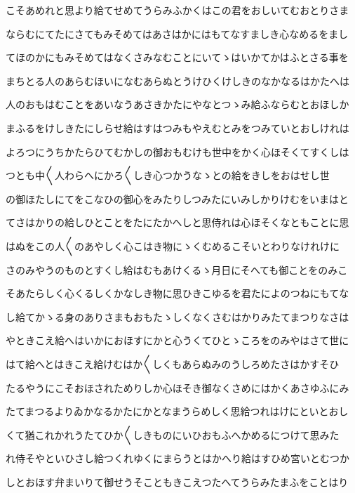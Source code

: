 \documentclass[a4paper,11pt,landscape]{ltjtarticle}
\begin{document}
\par\medskip
こそあめれと思より給てせめてうらみふかくはこの君をおしいてむおとりさま
\par\medskip
ならむにてたにさてもみそめてはあさはかにはもてなすましき心なめるをまし
\par\medskip
てほのかにもみそめてはなくさみなむことにいてゝはいかてかはふとさる事を
\par\medskip
まちとる人のあらむほいになむあらぬとうけひくけしきのなかなるはかたへは
\par\medskip
人のおもはむことをあいなうあさきかたにやなとつゝみ給ふならむとおほしか
\par\medskip
まふるをけしきたにしらせ給はすはつみもやえむとみをつみていとおしけれは
\par\medskip
よろつにうちかたらひてむかしの御おもむけも世中をかく心ほそくてすくしは
\par\medskip
つとも中〱人わらへにかろ〱しき心つかうなゝとの給をきしをおはせし世
\par\medskip
の御ほたしにてをこなひの御心をみたりしつみたにいみしかりけむをいまはと
\par\medskip
てさはかりの給しひとことをたにたかへしと思侍れは心ほそくなともことに思
\par\medskip
はぬをこの人〱のあやしく心こはき物にゝくむめるこそいとわりなけれけに
\par\medskip
さのみやうのものとすくし給はむもあけくるゝ月日にそへても御ことをのみこ
\par\medskip
そあたらしく心くるしくかなしき物に思ひきこゆるを君たによのつねにもてな
\par\medskip
し給てかゝる身のありさまもおもたゝしくなくさむはかりみたてまつりなさは
\par\medskip
やときこえ給へはいかにおほすにかと心うくてひとゝころをのみやはさて世に
\par\medskip
はて給へとはきこえ給けむはか〱しくもあらぬみのうしろめたさはかすそひ
\par\medskip
たるやうにこそおほされためりしか心ほそき御なくさめにはかくあさゆふにみ
\par\medskip
たてまつるよりゐかなるかたにかとなまうらめしく思給つれはけにといとおし
\par\medskip
くて猶これかれうたてひか〱しきものにいひおもふへかめるにつけて思みた
\par\medskip
れ侍そやといひさし給つくれゆくにまらうとはかへり給はすひめ宮いとむつか
\par\medskip
しとおほす弁まいりて御せうそこともきこえつたへてうらみたまふをことはり
\par\medskip
\end{document}
